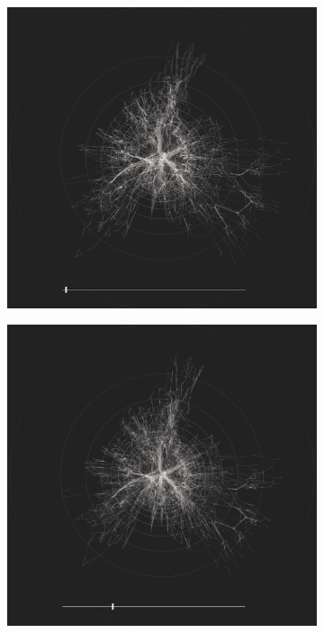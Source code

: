 \begin{figure}[H]
    \centering
     \begin{subfigure}[b]{.49\textwidth}
        \centering
    \includegraphics[width=\textwidth]{figures_c1/layout/confluent/0.png} 
    \caption{}
    \end{subfigure}
    \centering
     \begin{subfigure}[b]{.49\textwidth}
        \centering
    \includegraphics[width=\textwidth]{figures_c1/layout/confluent/25.png} \caption{}

\end{subfigure}
\end{figure}

